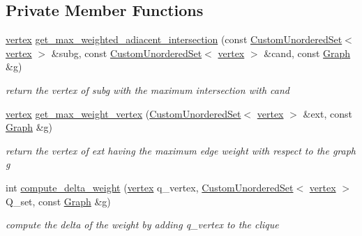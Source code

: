 \subsection*{Private Member Functions}
\begin{DoxyCompactItemize}
\item 
\hyperlink{classTTT__maximal__weighted__clique_ac6a30ba8fb726c9c83eafe9dc451a799}{vertex} \hyperlink{classTTT__maximal__weighted__clique_a16578cc181d38985609a864fd37a155f}{get\+\_\+max\+\_\+weighted\+\_\+adiacent\+\_\+intersection} (const \hyperlink{classCustomUnorderedSet}{Custom\+Unordered\+Set}$<$ \hyperlink{classTTT__maximal__weighted__clique_ac6a30ba8fb726c9c83eafe9dc451a799}{vertex} $>$ \&subg, const \hyperlink{classCustomUnorderedSet}{Custom\+Unordered\+Set}$<$ \hyperlink{classTTT__maximal__weighted__clique_ac6a30ba8fb726c9c83eafe9dc451a799}{vertex} $>$ \&cand, const \hyperlink{structGraph}{Graph} \&g)
\begin{DoxyCompactList}\small\item\em return the vertex of subg with the maximum intersection with cand \end{DoxyCompactList}\item 
\hyperlink{classTTT__maximal__weighted__clique_ac6a30ba8fb726c9c83eafe9dc451a799}{vertex} \hyperlink{classTTT__maximal__weighted__clique_adadf04df62faabaa24645aaf3516c31a}{get\+\_\+max\+\_\+weight\+\_\+vertex} (\hyperlink{classCustomUnorderedSet}{Custom\+Unordered\+Set}$<$ \hyperlink{classTTT__maximal__weighted__clique_ac6a30ba8fb726c9c83eafe9dc451a799}{vertex} $>$ \&ext, const \hyperlink{structGraph}{Graph} \&g)
\begin{DoxyCompactList}\small\item\em return the vertex of ext having the maximum edge weight with respect to the graph g \end{DoxyCompactList}\item 
int \hyperlink{classTTT__maximal__weighted__clique_a60a5925a276d2ff69e125c0754fb3127}{compute\+\_\+delta\+\_\+weight} (\hyperlink{classTTT__maximal__weighted__clique_ac6a30ba8fb726c9c83eafe9dc451a799}{vertex} q\+\_\+vertex, \hyperlink{classCustomUnorderedSet}{Custom\+Unordered\+Set}$<$ \hyperlink{classTTT__maximal__weighted__clique_ac6a30ba8fb726c9c83eafe9dc451a799}{vertex} $>$ Q\+\_\+set, const \hyperlink{structGraph}{Graph} \&g)
\begin{DoxyCompactList}\small\item\em compute the delta of the weight by adding q\+\_\+vertex to the clique \end{DoxyCompactList}\item 

\end{DoxyCompactItemize}
